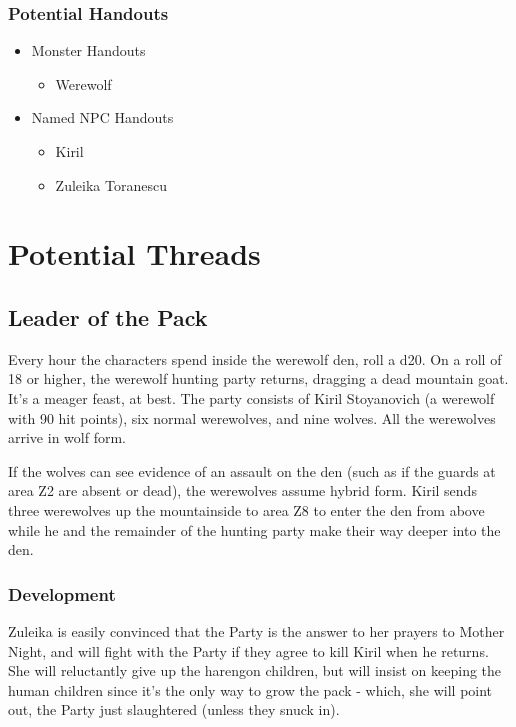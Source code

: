 \documentclass[a4paper,11pt]{article}
\begin{document}
\subsubsection{Potential Handouts}
\begin{itemize}
  \item Monster Handouts
  \begin{itemize}
    \item Werewolf 
  \end{itemize}
  \item Named NPC Handouts
  \begin{itemize}
    \item Kiril
    \item Zuleika Toranescu
  \end{itemize}
\end{itemize}

\section{Potential Threads}
\label{sec:PotentialThreads}
\subsection{Leader of the Pack}
Every hour the characters spend inside the werewolf den, roll a d20. On a roll of 18 or higher, the werewolf 
hunting party returns, dragging a dead mountain goat. It's a meager feast, at best. The party consists of Kiril 
Stoyanovich (a werewolf with 90 hit points), six normal werewolves, and nine wolves. All the werewolves arrive in 
wolf form.

If the wolves can see evidence of an assault on the den (such as if the guards at area Z2 are absent or dead), the 
werewolves assume hybrid form. Kiril sends three werewolves up the mountainside to area Z8 to enter the den from 
above while he and the remainder of the hunting party make their way deeper into the den.

\subsubsection{Development}
Zuleika is easily convinced that the Party is the answer to her prayers to Mother Night, and will fight with the
Party if they agree to kill Kiril when he returns. She will reluctantly give up the harengon children, but will 
insist on keeping the human children since it's the only way to grow the pack - which, she will point out, the 
Party just slaughtered (unless they snuck in).
\end{document}
